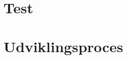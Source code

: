\begin{comment}
Webcam
	mode
	player?
	
Processor
	Thresholds
	Resolution
\end{comment}

\section{Test}

\section{Udviklingsproces}

\begin{comment}
	
Webcam
	Varetager forbindelse til webcam
	Henter BufferedImage i 320x240

Processor
	Billede ind som BufferedImage
	Parse til 2D-array
	Filtrering
	Optimering i walker
	Objekt-/robot ID
	Obstacle map
	Grafisk repræsentation
	Scaling (ej i brug)
	Returnerer Locations objekt til brug i pathfinder
	
Udviklingsproces
	Simpelt udgangspunkt
	Løbende tilføjet funktionalitet med behov fra stifinding
	Efter første full cycle udviklet i version 2 med optimeringer
	
Test
	Program t visuel test
	"Webcam-simulator"
	Benchmark kørsler, resultater
	Performance udvikling
\end{comment}